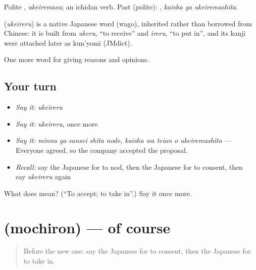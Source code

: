 Polite \textbf{}, \emph{ukeiremasu}; an ichidan verb. Past (polite): \textbf{ }, \emph{kaisha ga ukeiremashita}.

\begin{cousinweb}
\textbf{} (\emph{ukeireru}) is a native Japanese word (wago), inherited rather than borrowed from Chinese: it is built from \emph{ukeru}, \textquotedblleft{}to receive\textquotedblright{} and \emph{ireru}, \textquotedblleft{}to put in\textquotedblright{}, and its kanji were attached later as kun'yomi (JMdict).
\end{cousinweb}

\begin{grammarlens}[title={What you've built}]
One more word for giving reasons and opinions.
\end{grammarlens}

\subsection*{Your turn}
\begin{itemize}
\raggedright
  \item \emph{Say it:} \emph{ukeireru}
  \item \emph{Say it:} \emph{ukeireru}, once more
  \item \emph{Say it:} \emph{minna ga sansei shita node, kaisha wa teian o ukeiremashita} — Everyone agreed, so the company accepted the proposal.
  \item \emph{Recall:} say the Japanese for to nod, then the Japanese for to consent, then say \emph{ukeireru} again
\end{itemize}

\begin{tcolorbox}[breakable,colback=teal!4,colframe=teal!35!black,title={Before you move on}]
What does  mean? (\textquotedblleft{}To accept; to take in\textquotedblright{}.) Say it once more.
\end{tcolorbox}
\section[\texorpdfstring{\ja{もちろん} (mochiron)}{もちろん (mochiron)}]{ (mochiron) — of course}

\label{lesson:JA-C322-mochiron}



\begin{quote}
Before the new one: say the Japanese for to consent, then the Japanese for to take in.
\end{quote}

